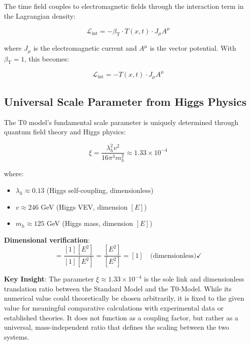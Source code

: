 \documentclass[12pt,a4paper]{article}
\newcommand{\Tfieldt}{T(x,t)}
\newcommand{\betaT}{\beta_{\text{T}}}
\newcommand{\xipar}{\xi}
\begin{document}
	The time field couples to electromagnetic fields through the interaction term in the Lagrangian density:
	
	\begin{equation}
		\mathcal{L}_{\text{int}} = -\betaT \cdot \Tfieldt \cdot J_{\mu} A^{\mu}
	\end{equation}
	
	where $J_{\mu}$ is the electromagnetic current and $A^{\mu}$ is the vector potential. With $\betaT = 1$, this becomes:
	
	\begin{equation}
		\mathcal{L}_{\text{int}} = -\Tfieldt \cdot J_{\mu} A^{\mu}
	\end{equation}
	
	\subsection{Universal Scale Parameter from Higgs Physics}
	\label{subsec:universal_scale_parameter}
	
	The T0 model's fundamental scale parameter is uniquely determined through quantum field theory and Higgs physics:
	
	\begin{equation}
		\boxed{\xipar = \frac{\lambda_h^2 v^2}{16\pi^3 m_h^2} \approx 1.33 \times 10^{-4}}
		\label{eq:xi_higgs_universal}
	\end{equation}
	
	where:
	\begin{itemize}
		\item $\lambda_h \approx 0.13$ (Higgs self-coupling, dimensionless)
		\item $v \approx 246$ GeV (Higgs VEV, dimension $[E]$)
		\item $m_h \approx 125$ GeV (Higgs mass, dimension $[E]$)
	\end{itemize}
	
	\textbf{Dimensional verification}:
	\begin{equation}
		[\xipar] = \frac{[1][E^2]}{[1][E^2]} = \frac{[E^2]}{[E^2]} = [1] \quad \text{(dimensionless)} \checkmark
	\end{equation}
	
\begin{tcolorbox}[colback=green!5!white,colframe=green!75!black,title=Universal Scale Parameter]
	\textbf{Key Insight}: The parameter $\xipar \approx 1.33 \times 10^{-4}$ is the sole link and dimensionless translation ratio between the Standard Model and the T0-Model. While its numerical value could theoretically be chosen arbitrarily, it is fixed to the given value for meaningful comparative calculations with experimental data or established theories. It does not function as a coupling factor, but rather as a universal, mass-independent ratio that defines the scaling between the two systems.
\end{tcolorbox}
	
\end{document}
